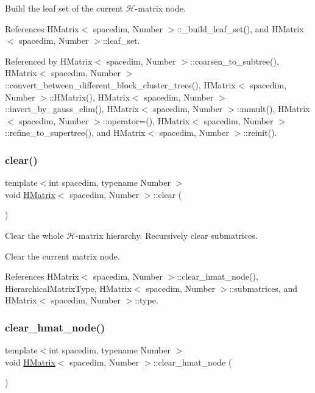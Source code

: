 Build the leaf set of the current $\mathcal{H}$-\/matrix node. 

References H\+Matrix$<$ spacedim, Number $>$\+::\+\_\+build\+\_\+leaf\+\_\+set(), and H\+Matrix$<$ spacedim, Number $>$\+::leaf\+\_\+set.



Referenced by H\+Matrix$<$ spacedim, Number $>$\+::coarsen\+\_\+to\+\_\+subtree(), H\+Matrix$<$ spacedim, Number $>$\+::convert\+\_\+between\+\_\+different\+\_\+block\+\_\+cluster\+\_\+trees(), H\+Matrix$<$ spacedim, Number $>$\+::\+H\+Matrix(), H\+Matrix$<$ spacedim, Number $>$\+::invert\+\_\+by\+\_\+gauss\+\_\+elim(), H\+Matrix$<$ spacedim, Number $>$\+::mmult(), H\+Matrix$<$ spacedim, Number $>$\+::operator=(), H\+Matrix$<$ spacedim, Number $>$\+::refine\+\_\+to\+\_\+supertree(), and H\+Matrix$<$ spacedim, Number $>$\+::reinit().

\mbox{\label{classHMatrix_ae55bd45587b895bfdb977e7cbea46519}} 
\subsubsection{\texorpdfstring{clear()}{clear()}}
{\footnotesize\ttfamily template$<$int spacedim, typename Number $>$ \\
void \hyperlink{classHMatrix}{H\+Matrix}$<$ spacedim, Number $>$\+::clear (\begin{DoxyParamCaption}{ }\end{DoxyParamCaption})}

Clear the whole $\mathcal{H}$-\/matrix hierarchy. Recursively clear submatrices.

Clear the current matrix node.

References H\+Matrix$<$ spacedim, Number $>$\+::clear\+\_\+hmat\+\_\+node(), Hierarchical\+Matrix\+Type, H\+Matrix$<$ spacedim, Number $>$\+::submatrices, and H\+Matrix$<$ spacedim, Number $>$\+::type.

\mbox{\label{classHMatrix_aec0815bc9c3654391bb2b3095383e6cb}} 
\subsubsection{\texorpdfstring{clear\+\_\+hmat\+\_\+node()}{clear\_hmat\_node()}}
{\footnotesize\ttfamily template$<$int spacedim, typename Number $>$ \\
void \hyperlink{classHMatrix}{H\+Matrix}$<$ spacedim, Number $>$\+::clear\+\_\+hmat\+\_\+node (\begin{DoxyParamCaption}{ }\end{DoxyParamCaption})}

